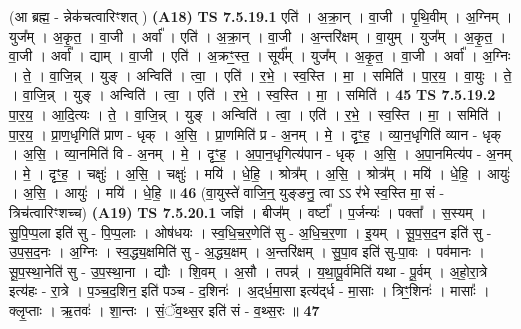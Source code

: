 \documentclass[17pt]{extarticle}
\begin{document}
                  \newline
                      (आ ब्रह्म॒ - न्नेक॑चत्वारिꣳशत् ) \textbf{(A18)} \newline \newline
                                \textbf{ TS 7.5.19.1} \newline
                  एति॑ । अ॒क्रा॒न् । वा॒जी । पृ॒थि॒वीम् । अ॒ग्निम् । युज᳚म् । अ॒कृ॒त॒ । वा॒जी । अर्वा᳚ । एति॑ । अ॒क्रा॒न् । वा॒जी । अ॒न्तरि॑क्षम् । वा॒युम् । युज᳚म् । अ॒कृ॒त॒ । वा॒जी । अर्वा᳚ । द्याम् । वा॒जी । एति॑ । अ॒क्रꣳ॒॒स्त॒ । सूर्य᳚म् । युज᳚म् । अ॒कृ॒त॒ । वा॒जी । अर्वा᳚ । अ॒ग्निः । ते॒ । वा॒जि॒न्न् । युङ् । अन्विति॑ । त्वा॒ । एति॑ । र॒भे॒ । स्व॒स्ति । मा॒ । समिति॑ । पा॒र॒य॒ । वा॒युः । ते॒ । वा॒जि॒न्न् । युङ् । अन्विति॑ । त्वा॒ । एति॑ । र॒भे॒ । स्व॒स्ति । मा॒ । समिति॑ । \textbf{  45} \newline
                  \newline
                                \textbf{ TS 7.5.19.2} \newline
                  पा॒र॒य॒ । आ॒दि॒त्यः । ते॒ । वा॒जि॒न्न् । युङ् । अन्विति॑ । त्वा॒ । एति॑ । र॒भे॒ । स्व॒स्ति । मा॒ । समिति॑ । पा॒र॒य॒ । प्रा॒ण॒धृगिति॑ प्राण - धृक् । अ॒सि॒ । प्रा॒णमिति॑ प्र - अ॒नम् । मे॒ । दृꣳ॒॒ह॒ । व्या॒न॒धृगिति॑ व्यान - धृक् । अ॒सि॒ । व्या॒नमिति॑ वि - अ॒नम् । मे॒ । दृꣳ॒॒ह॒ । अ॒पा॒न॒धृगित्य॑पान - धृक् । अ॒सि॒ । अ॒पा॒नमित्य॑प - अ॒नम् । मे॒ । दृꣳ॒॒ह॒ । चक्षुः॑ । अ॒सि॒ । चक्षुः॑ । मयि॑ । धे॒हि॒ । श्रोत्र᳚म् । अ॒सि॒ । श्रोत्र᳚म् । मयि॑ । धे॒हि॒ । आयुः॑ । अ॒सि॒ । आयुः॑ । मयि॑ । धे॒हि॒ ॥ \textbf{  46} \newline
                  \newline
                      (वा॒युस्ते॑ वाजि॒न्॒ युङ्ङनु॒ त्वा ऽऽ र॑भे स्व॒स्ति मा॒ सं - त्रिच॑त्वारिꣳशच्च)  \textbf{(A19)} \newline \newline
                                \textbf{ TS 7.5.20.1} \newline
                  जज्ञि॑ । बीज᳚म् । वर्ष्टा᳚ । प॒र्जन्यः॑ । पक्ता᳚ । स॒स्यम् । सु॒पि॒प्प॒ला इति॑ सु - पि॒प्प॒लाः । ओष॑धयः । स्व॒धि॒च॒र॒णेति॑ सु - अ॒धि॒च॒र॒णा । इ॒यम् । सू॒प॒स॒द॒न इति॑ सु - उ॒प॒स॒द॒नः । अ॒ग्निः । स्व॒द्ध्य॒क्षमिति॑ सु - अ॒द्ध्य॒क्षम् । अ॒न्तरि॑क्षम् । सु॒पा॒व इति॑ सु-पा॒वः । पव॑मानः । सू॒प॒स्था॒नेति॑ सु - उ॒प॒स्था॒ना । द्यौः । शि॒वम् । अ॒सौ । तपन्न्॑ । य॒था॒पू॒र्वमिति॑ यथा - पू॒र्वम् । अ॒हो॒रा॒त्रे इत्य॑हः - रा॒त्रे । प॒ञ्च॒द॒शिन॒ इति॑ पञ्च - द॒शिनः॑ । अ॒द्‌र्ध॒मा॒सा इत्य॑द्‌र्ध - मा॒साः । त्रिꣳ॒॒शिनः॑ । मासाः᳚ । क्लृ॒प्ताः । ऋ॒तवः॑ । शा॒न्तः । सं॒ॅव॒थ्स॒र इति॑ सं - व॒थ्स॒रः ॥ \textbf{  47} \newline
\end{document}
